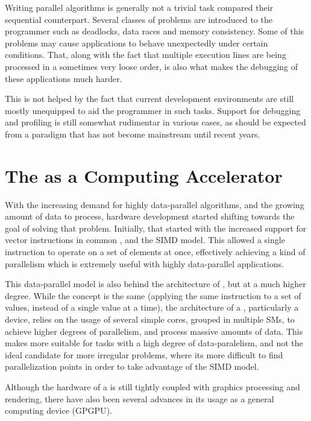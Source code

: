 \documentclass[main.tex]{subfiles}
\begin{document}
Writing parallel algorithms is generally not a trivial task compared their sequential counterpart. Several classes of problems are introduced to the programmer such as deadlocks, data races and memory consistency. Some of this problems may cause applications to behave unexpectedly under certain conditions. That, along with the fact that multiple execution lines are being processed in a sometimes very loose order, is also what makes the debugging of these applications much harder.

This is not helped by the fact that current development environments are still mostly unequipped to aid the programmer in such tasks. Support for debugging and profiling is still somewhat rudimentar in various cases, as should be expected from a paradigm that has not become mainstream until recent years.


\section{The \gpu as a Computing Accelerator}

With the increasing demand for highly data-parallel algorithms, and the growing amount of data to process, hardware development started shifting towards the goal of solving that problem. Initially, that started with the increased support for vector instructions in common \cpus, and the \acs{SIMD} model. This allowed a single instruction to operate on a set of elements at once, effectively achieving a kind of parallelism which is extremely useful with highly data-parallel applications.

This data-parallel model is also behind the architecture of \gpus, but at a much higher degree. While the concept is the same (applying the same instruction to a set of values, instead of a single value at a time), the architecture of a \gpu, particularly a \cuda device, relies on the usage of several simple cores, grouped in multiple \aclp{SM}, to achieve higher degrees of parallelism, and process massive amounts of data. This makes \gpus more suitable for tasks with a high degree of data-paralelism, and not the ideal candidate for more irregular problems, where its more difficult to find parallelization points in order to take advantage of the \acs{SIMD} model.

Although the hardware of a \gpu is still tightly coupled with graphics processing and rendering, there have also been several advances in its usage as a general computing device (\acs{GPGPU}). 
\end{document}
